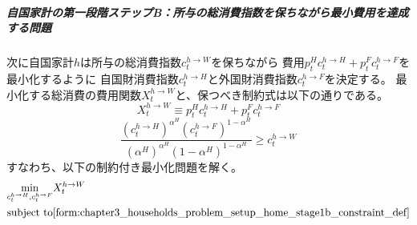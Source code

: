 \subparagraph{自国家計の第一段階ステップB：所与の総消費指数を保ちながら最小費用を達成する問題}
\label{sec:chapter3_households_problem_setup_home_stage1b}
次に自国家計\(h\)は所与の総消費指数\(c_t^{h\to W}\)を保ちながら
費用\(p_t^Hc_t^{h\to H}+p_t^Fc_t^{h\to F}\)を最小化するように
自国財消費指数\(c_t^{h\to H}\)と外国財消費指数\(c_t^{h\to F}\)を決定する。
最小化する総消費の費用関数\(X_t^{h\to W}\)と、保つべき制約式は以下の通りである。
\begin{equation}
\label{form:chapter3_households_problem_setup_home_stage1b_X_def}
    X_t^{h\to W}\equiv p_t^Hc_t^{h\to H}+p_t^Fc_t^{h\to F}
\end{equation}
\begin{equation}
\label{form:chapter3_households_problem_setup_home_stage1b_constraint_def}
    \frac{(c_t^{h\to H})^{\alpha^H}(c_t^{h\to F})^{1-\alpha^H}}{(\alpha^H)^{\alpha^H}(1-\alpha^H)^{1-\alpha^H}}\ge c_t^{h\to W}
\end{equation}
すなわち、以下の制約付き最小化問題を解く。
\begin{equation}
\label{form:chapter3_households_problem_setup_home_stage1b_min_def}
    \begin{aligned}
        \min_{c_t^{h\to H},c_t^{h\to F}}
        &X_t^{h\to W}\\
        \text{subject to}
        &\eqref{form:chapter3_households_problem_setup_home_stage1b_constraint_def}
    \end{aligned}
\end{equation}

